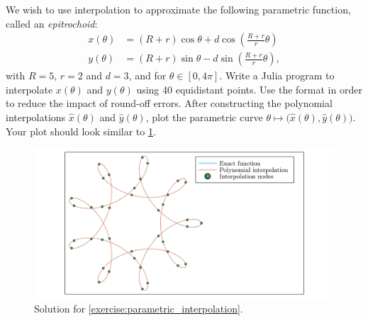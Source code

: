\begin{compexercise}
    \label{exercise:parametric_interpolation}
    We wish to use interpolation to approximate the following parametric function,
    called an \emph{epitrochoid}:
    \begin{align}
        x (\theta) &= (R + r)\cos\theta + d\cos\left(\frac{R + r}{r}\theta\right) \\
      y (\theta) &= (R + r)\sin\theta - d\sin\left(\frac{R + r}{r}\theta\right),
    \end{align}
    with $R = 5$, $r = 2$ and $d = 3$, and for $\theta \in [0, 4\pi]$.
    Write a Julia program to interpolate $x(\theta)$ and $y(\theta)$ using 40 equidistant points.
    Use the  format in order to reduce the impact of round-off errors.
    After constructing the polynomial interpolations $\widehat x(\theta)$ and $\widehat y(\theta)$,
    plot the parametric curve $\theta \mapsto \bigl(\widehat x(\theta), \widehat y(\theta)\bigr)$.
    Your plot should look similar to \cref{fig:parametric_interpolation}.
    \begin{figure}[ht]
        \centering
        \includegraphics[width=0.99\linewidth]{figures/interpolation.pdf}
        \caption{Solution for \cref{exercise:parametric_interpolation}.}%
        \label{fig:parametric_interpolation}
    \end{figure}
\end{compexercise}

